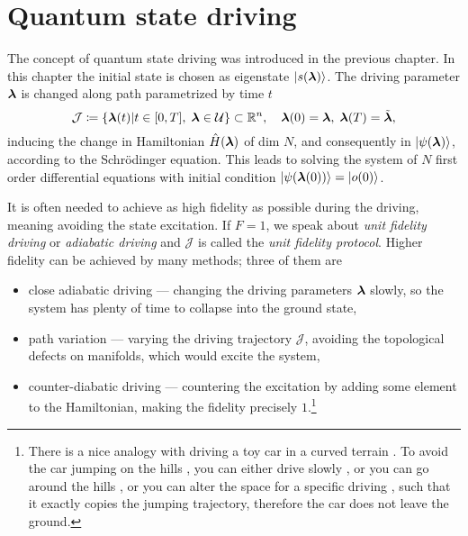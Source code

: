 \chapter{Quantum state driving}
\label{chap:typesOfDriving}
The concept of quantum state driving was introduced in the previous chapter. In this chapter the initial state is chosen as eigenstate $\ket{s({\bm\lambda})}$. The driving parameter ${\bm\lambda}$ is changed along path parametrized by time $t$
\begin{equation}
    \mathcal J\coloneqq\{{\bm\lambda}(t)|t\in[0,T],\; {\bm\lambda}\in \mathcal U\} \subset \mathbb{R}^n,\quad {\bm\lambda}(0)={\bm\lambda},\; {\bm\lambda}(T)=\tilde{{\bm\lambda}},
    \label{eq:defJ_QSdriving}
\end{equation}
inducing the change in Hamiltonian $\hat{H}({\bm\lambda})$ of dim $N$, and consequently in $\ket{\psi({\bm\lambda})}$, according to the Schr\"odinger equation. This leads to solving the system of $N$ first order differential equations with initial condition $\ket{\psi({\bm\lambda}(0))}=\ket{o(0)}$.

It is often needed to achieve as high fidelity as possible during the driving, meaning avoiding the state excitation. If $F=1$, we speak about \emph{unit fidelity driving} or \emph{adiabatic driving} and $\mathcal J$ is called the \emph{unit fidelity protocol}. Higher fidelity can be achieved by many methods; three of them are
\begin{itemize}
    \item close adiabatic driving — changing the driving parameters ${\bm\lambda}$ slowly, so the system has plenty of time to collapse into the ground state,
    \item path variation — varying the driving trajectory $\mathcal J$, avoiding the topological defects on manifolds, which would excite the system,
    \item counter-diabatic driving — countering the excitation by adding some element to the Hamiltonian, making the fidelity precisely $1$.\footnote{There is a nice analogy with driving a toy car  in a curved terrain . To avoid the car jumping on the hills , you can either drive slowly , or you can go around the hills , or you can alter the space for a specific driving , such that it exactly copies the jumping trajectory, therefore the car does not leave the ground.}
\end{itemize}

